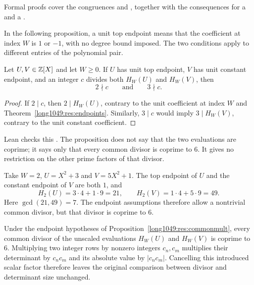 \documentclass[11pt]{article}
\begin{document}
\noindent Formal proofs cover the congruences
 and
, together with the consequences for a
 and a
.

In the following proposition, a unit top endpoint means that the
coefficient at index $W$ is $1$ or $-1$, with no degree bound imposed.
The two conditions apply to different entries of the polynomial pair.

\begin{proposition}\label{long1049:res:commonmult}
Let \(U,V\in\mathbb{Z}[X]\) and let \(W\ge0\).  If \(U\) has unit top endpoint, \(V\)
has unit constant endpoint, and an integer
\(c\) divides both \(H_W(U)\) and \(H_W(V)\), then
\[
 2\nmid c\qquad\text{and}\qquad 3\nmid c.
\]
\end{proposition}
\begin{proof}
If $2\mid c$, then $2\mid H_W(U)$, contrary to the unit coefficient
at index $W$ and Theorem~\ref{long1049:res:endpoints}. Similarly,
$3\mid c$ would imply $3\mid H_W(V)$, contrary to the unit constant
coefficient.
\end{proof}

\noindent Lean checks this
.  The proposition does not say that the two evaluations are coprime;
it says only that every common divisor is coprime to $6$. It gives
no restriction on the other prime factors of that divisor.

\begin{example}\label{long1049:ex:commonmult}
Take \(W=2\), \(U=X^2+3\) and \(V=5X^2+1\).  The top endpoint of \(U\) and the
constant endpoint of \(V\) are both \(1\), and
\[
 H_2(U)=3\cdot4+1\cdot9=21,\qquad H_2(V)=1\cdot4+5\cdot9=49 .
\]
Here $\gcd(21,49)=7$. The endpoint assumptions therefore allow a
nontrivial common divisor, but that divisor is coprime to $6$.
\end{example}

\begin{corollary}\label{long1049:res:nomult}
Under the endpoint hypotheses of Proposition~\ref{long1049:res:commonmult},
every common divisor of the unscaled evaluations $H_W(U)$ and $H_W(V)$
is coprime to $6$. Multiplying two integer rows by nonzero integers
$c_n,c_m$ multiplies their determinant by $c_nc_m$ and its absolute
value by $|c_nc_m|$. Cancelling this introduced scalar factor therefore
leaves the original comparison between divisor and determinant size
unchanged.
\end{corollary}
\end{document}
